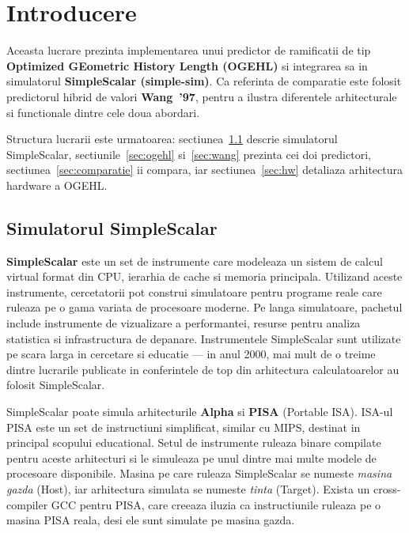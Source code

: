 \section{Introducere}

Aceasta lucrare prezinta implementarea unui predictor de ramificatii de tip
\textbf{Optimized GEometric History Length (OGEHL)} si integrarea sa in simulatorul
\textbf{SimpleScalar (simple-sim)}. Ca referinta de comparatie este folosit predictorul
hibrid de valori \textbf{Wang~'97}, pentru a ilustra diferentele
arhitecturale si functionale dintre cele doua abordari.

Structura lucrarii este urmatoarea: sectiunea~\ref{sec:simplescalar} descrie
simulatorul SimpleScalar, sectiunile~\ref{sec:ogehl} si~\ref{sec:wang} prezinta
cei doi predictori, sectiunea~\ref{sec:comparatie} ii compara, iar
sectiunea~\ref{sec:hw} detaliaza arhitectura hardware a OGEHL.

\subsection{Simulatorul SimpleScalar}
\label{sec:simplescalar}

\textbf{SimpleScalar} este un set de instrumente \cite{austin1997user} care modeleaza un sistem de
calcul virtual format din CPU, ierarhia de cache si memoria principala.
Utilizand aceste instrumente, cercetatorii pot construi simulatoare pentru
programe reale care ruleaza pe o gama variata de procesoare moderne.
Pe langa simulatoare, pachetul include instrumente de vizualizare a
performantei, resurse pentru analiza statistica si infrastructura de depanare.
Instrumentele SimpleScalar sunt utilizate pe scara larga in cercetare si
educatie --- in anul 2000, mai mult de o treime dintre lucrarile publicate in
conferintele de top din arhitectura calculatoarelor au folosit SimpleScalar.

SimpleScalar poate simula arhitecturile \textbf{Alpha} si \textbf{PISA}
(Portable ISA). ISA-ul PISA este un set de instructiuni simplificat, similar
cu MIPS, destinat in principal scopului educational. Setul de instrumente
ruleaza binare compilate pentru aceste arhitecturi si le simuleaza pe unul
dintre mai multe modele de procesoare disponibile. Masina pe care ruleaza
SimpleScalar se numeste \textit{masina gazda} (Host), iar arhitectura
simulata se numeste \textit{tinta} (Target). Exista un cross-compiler GCC
pentru PISA, care creeaza iluzia ca instructiunile ruleaza pe o masina PISA
reala, desi ele sunt simulate pe masina gazda.

